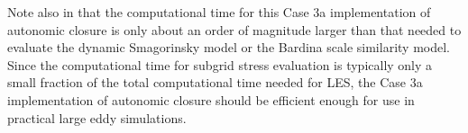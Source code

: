 Note also in  that the computational time for this Case 3a implementation of autonomic closure is only about an order of magnitude larger than that needed to evaluate the dynamic Smagorinsky model or the Bardina scale similarity model. Since the computational time for subgrid stress evaluation is typically only a small fraction of the total computational time needed for LES, the Case 3a implementation of autonomic closure should be efficient enough for use in practical large eddy simulations.
